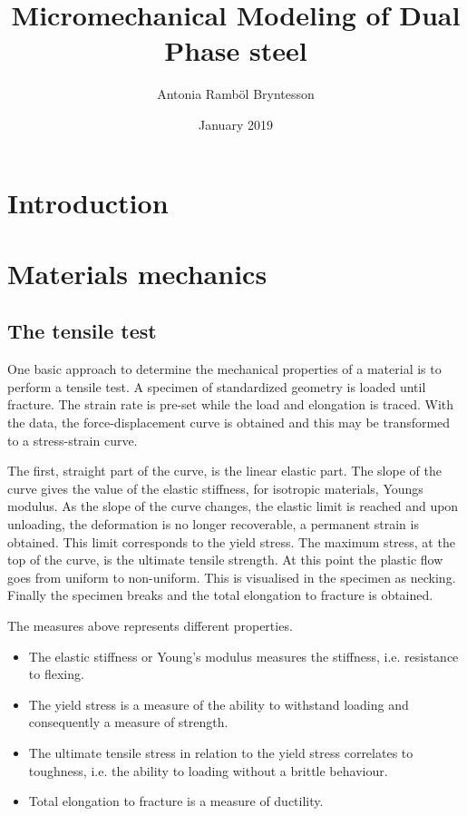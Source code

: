 \documentclass{article}
\title{Micromechanical Modeling of Dual Phase steel}
\author{Antonia Ramböl Bryntesson}
\date{January 2019}
\begin{document}
\maketitle
\tableofcontents
\section{Introduction}
\section{Materials mechanics}
\subsection{The tensile test}
\label{Section:Tensiletest}
One basic approach to determine the mechanical properties of a material is to perform a tensile test. A specimen of standardized geometry is loaded until fracture. The strain rate is pre-set while the load and elongation is traced. With the data, the force-displacement curve is obtained and this may be transformed to a stress-strain curve.

The first, straight part of the curve, is the linear elastic part. The slope of the curve gives the value of the elastic stiffness, for isotropic materials, Youngs modulus. As the slope of the curve changes, the elastic limit is reached and upon unloading, the deformation is no longer recoverable, a permanent strain is obtained. This limit corresponds to the yield stress. The maximum stress, at the top of the curve, is the ultimate tensile strength. At this point the plastic flow goes from uniform to non-uniform. This is visualised in the specimen as necking. Finally the specimen breaks and the total elongation to fracture is obtained.

The measures above represents different properties.
\begin{itemize}
    \item The elastic stiffness or Young's modulus measures the stiffness, i.e. resistance to flexing.
    \item The yield stress is a measure of the ability to withstand loading and consequently a measure of strength. 
    \item The ultimate tensile stress in relation to the yield stress correlates to toughness, i.e. the ability to loading without a brittle behaviour.
    \item Total elongation to fracture is a measure of ductility.
\end{itemize}
\end{document}
